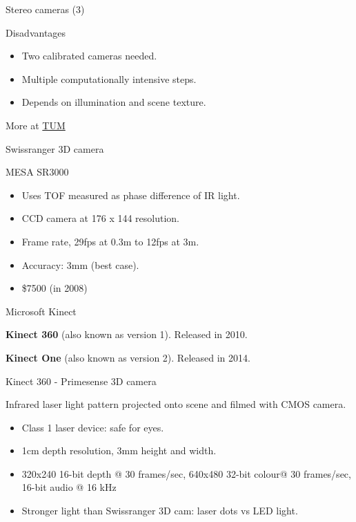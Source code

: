 \documentclass[compress]{beamer}
\begin{document}
\begin{frame}{Stereo cameras (3)}

Disadvantages

\begin{itemize}

\item
  Two calibrated cameras needed.
\item
  Multiple computationally intensive steps.
\item
  Depends on illumination and scene texture.
\end{itemize}

More at
\href{http://campar.in.tum.de/twiki/pub/Chair/TeachingSs11Kinect/2011-DSensors_LabCourse_Kinect.pdf}{TUM}

\end{frame}

\begin{frame}{Swissranger 3D camera}

MESA SR3000

\begin{itemize}

\item
  Uses TOF measured as phase difference of IR light.
\item
  CCD camera at 176 x 144 resolution.
\item
  Frame rate, 29fps at 0.3m to 12fps at 3m.
\item
  Accuracy: 3mm (best case).
\item
  \$7500 (in 2008)
\end{itemize}

\end{frame}

\begin{frame}{Microsoft Kinect}

\textbf{Kinect 360} (also known as version 1). Released in 2010.

\textbf{Kinect One} (also known as version 2). Released in 2014.

\end{frame}

\begin{frame}{Kinect 360 - Primesense 3D camera}

Infrared laser light pattern projected onto scene and filmed with CMOS
camera.

\begin{itemize}

\item
  Class 1 laser device: safe for eyes.
\item
  1cm depth resolution, 3mm height and width.
\item
  320x240 16-bit depth @ 30 frames/sec, 640x480 32-bit colour@ 30
  frames/sec, 16-bit audio @ 16 kHz
\item
  Stronger light than Swissranger 3D cam: laser dots vs LED light.
\end{itemize}

\end{frame}
\end{document}

